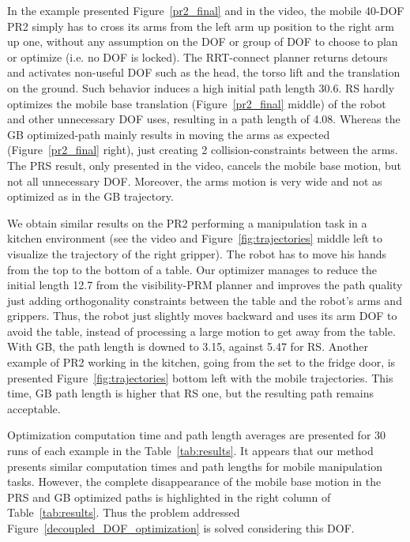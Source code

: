\documentclass{tADR2e}
\begin{document}
In the example presented Figure~\ref{pr2_final} and in the video, the mobile 
40-DOF PR2 simply has to cross its arms from 
the left arm up position to the right arm up one, without any assumption on the DOF or group of DOF to choose to plan or optimize (i.e. no DOF is locked). 
The RRT-connect planner 
returns detours and activates non-useful DOF such as the head, the torso lift 
and the translation on the ground. Such behavior induces a high initial path length 
30.6. RS hardly optimizes the mobile base 
translation (Figure~\ref{pr2_final} middle) of the robot and other unnecessary DOF 
uses, resulting in a path length of 4.08.
Whereas the GB optimized-path mainly 
results in moving the arms as expected (Figure~\ref{pr2_final} right), just creating 2 collision-constraints between the arms. The PRS 
result, only presented in the video, cancels the mobile base motion, but not all 
unnecessary DOF. Moreover, the arms motion is very wide and not as optimized as in 
the GB trajectory.



We obtain similar results on the PR2 performing a manipulation task 
in a kitchen environment (see the video and Figure~\ref{fig:trajectories} middle 
left to visualize the trajectory of the right gripper). The robot has to move 
his hands from the top to the bottom of a table.
Our optimizer manages to reduce the initial length 12.7 from the visibility-PRM 
planner and improves the path quality 
just adding orthogonality constraints between the table and the 
robot's arms and grippers. Thus, the robot just slightly moves 
backward and uses its arm DOF to avoid the table, instead of 
processing a large motion to get away from the table. With GB, the path length is 
downed to 3.15, against 5.47 for RS.
Another example of PR2 working in the kitchen, going from the set to the fridge 
door, is presented Figure~\ref{fig:trajectories} bottom left with the mobile 
trajectories. This time, GB path length is higher that RS one, but the resulting 
path remains acceptable.

\vspace{0.4cm}

Optimization computation time and path length averages are presented for 30 runs of 
each example in the Table~\ref{tab:results}.
It appears that our method presents 
similar computation times and path lengths for mobile manipulation tasks. However, 
the complete disappearance of the mobile base motion in the PRS and GB optimized 
paths is highlighted in the right column of Table~\ref{tab:results}. Thus the 
problem addressed Figure~\ref{decoupled_DOF_optimization} is solved considering this 
DOF.
\end{document}
